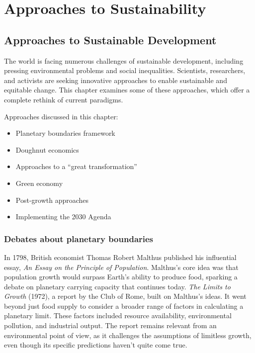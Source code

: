 \documentclass[
  a4paper,
  DIV=11,
  numbers=noendperiod,
  oneside,
  openany]{scrreprt}
\begin{document}
\part{Approaches to Sustainability}

\chapter{Approaches to Sustainable
Development}\label{approaches-to-sustainable-development}

The world is facing numerous challenges of sustainable development,
including pressing environmental problems and social inequalities.
Scientists, researchers, and activists are seeking innovative approaches
to enable sustainable and equitable change. This chapter examines some
of these approaches, which offer a complete rethink of current
paradigms.

Approaches discussed in this chapter:

\begin{itemize}
\item
  Planetary boundaries framework
\item
  Doughnut economics
\item
  Approaches to a ``great transformation''
\item
  Green economy
\item
  Post-growth approaches
\item
  Implementing the 2030 Agenda
\end{itemize}

\section{Debates about planetary
boundaries}\label{debates-about-planetary-boundaries}

In 1798, British economist Thomas Robert Malthus published his
influential essay, \emph{An Essay on the Principle of Population}.
Malthus's core idea was that population growth would surpass Earth's
ability to produce food, sparking a debate on planetary carrying
capacity that continues today. \emph{The Limits to Growth} (1972), a
report by the Club of Rome, built on Malthus's ideas. It went beyond
just food supply to consider a broader range of factors in calculating a
planetary limit. These factors included resource availability,
environmental pollution, and industrial output. The report remains
relevant from an environmental point of view, as it challenges the
assumptions of limitless growth, even though its specific predictions
haven't quite come true.
\end{document}
